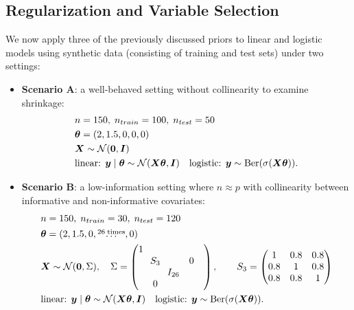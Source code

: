 \subsection{Regularization and Variable Selection}

We now apply three of the previously discussed priors to linear and logistic models using synthetic data (consisting of training and test sets) under two settings:

\begin{itemize}
    \item \textbf{Scenario A}: a well-behaved setting without collinearity to examine shrinkage:
    \begin{equation*}
        \begin{aligned}
            &n = 150,\; n_{train} = 100,\;n_{test} = 50 \\
            &\bm{\theta} = (2, 1.5, 0, 0, 0) \\
            &\bm{X} \sim \mathcal{N}(\bm{0}, \bm{I}) \\
            &\text{linear: } \bm{y} \mid \bm{\theta} \sim \mathcal{N}(\bm{X} \bm{\theta},\bm{I})\quad \text{logistic: } \bm{y} \sim \text{Ber}(\sigma(\bm{X} \bm{\theta})).
        \end{aligned}
    \end{equation*}
    \item \textbf{Scenario B}: a low-information setting where $n \approx p$ with collinearity between informative and non-informative covariates:
    \begin{equation*}
        \begin{aligned}
            &n = 150,\; n_{train} = 30,\;n_{test} = 120 \\
            &\bm{\theta} = (2, 1.5, 0, \overset{26\; \text{times}}{\dots}, 0) \\
            &\bm{X} \sim \mathcal{N}(\bm{0}, \Sigma), \quad \Sigma =
                    \begin{pmatrix}
                    1 &        &         &        &        \\
                        & \!\!S_3\!\! &        & 0      &        \\
                        &        & I_{26} &        &        \\
                        & 0      &        &        &        \\
                    \end{pmatrix},
                    \qquad
                    S_3 = 
                    \begin{pmatrix}
                    1   & 0.8 & 0.8\\
                    0.8 & 1   & 0.8\\
                    0.8 & 0.8 & 1
                    \end{pmatrix}\\
            &\text{linear: } \bm{y} \mid \bm{\theta} \sim \mathcal{N}(\bm{X} \bm{\theta}, \bm{I})\quad \text{logistic: } \bm{y} \sim \text{Ber}(\sigma(\bm{X} \bm{\theta})).
        \end{aligned}
    \end{equation*}
\end{itemize}

